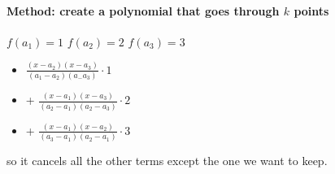 \documentclass{article}
\begin{document}
\paragraph{Method: create a polynomial that goes through \( k \) points}

$f(a_1) = 1$
$f(a_2) = 2$
$f(a_3) = 3$

\begin{itemize}
    \item $ \frac{(x - a_2)(x - a_3)}{(a_1 - a_2)(a_ - a_3)} \cdot 1 $
    \item + $ \frac{(x - a_1)(x - a_3)}{(a_2 - a_1)(a_2 - a_3)} \cdot 2 $
    \item + $ \frac{(x - a_1)(x - a_2)}{(a_3 - a_1)(a_2 - a_1)} \cdot 3 $
\end{itemize}

so it cancels all the other terms except the one we want to keep.
\end{document}
